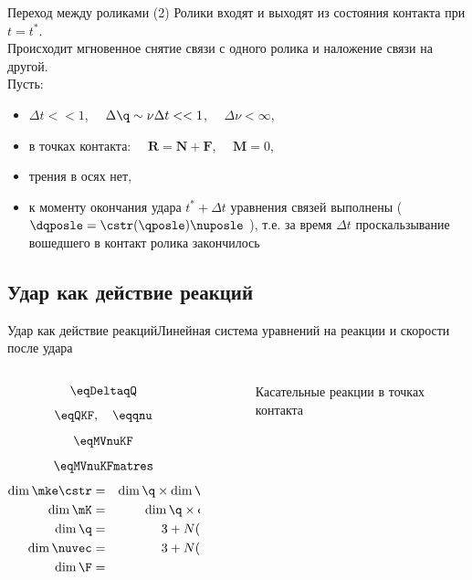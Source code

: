 \documentclass{beamer}
\begin{document}
\begin{frame}{Переход между роликами}
    \textcolor{Periwinkle}{(2) Ролики входят и выходят из состояния контакта при $t = t^*$.}\\
    Происходит мгновенное снятие связи с одного ролика и наложение связи на другой.\\
    Пусть:
    \begin{itemize}
        \item $\Delta t << 1$, $\quad \Delta \q \sim \nu\Delta t << 1$, $\quad \Delta \nu < \infty$,
        \item в точках контакта: $\quad \mathbf{R} = \mathbf{N} + \mathbf{F}$, $\quad \mathbf{M} = 0 $,
        \item трения в осях нет,
        \item к моменту окончания удара $t^*+\Delta t$ уравнения связей выполнены (\enspace $\dqposle = \cstr(\qposle)\nuposle \ $), т.е. за время $\Delta t$ проскальзывание вошедшего в контакт ролика закончилось
    \end{itemize}
\end{frame}

\subsection{Удар как действие реакций}

\begin{frame}{Удар как действие реакций}{Линейная система уравнений на реакции и скорости после удара}
    \begin{columns}
        \hspace{15pt}
        \begin{column}{0.35\textwidth}
            \vspace{-10pt}
            $$ \eqDeltaqQ $$
            $$ \eqQKF, \quad \eqqnu $$
            $$ \eqMVnuKF $$
            $$ \eqMVnuKFmatres $$
            \begin{eqnarray*}
                \dim \mke \cstr & = & \dim \q \times \dim \nuvec \\
                \dim \mK & = & \dim \q \times \dim \F \\
                \dim \q & = & 3 + N(n + 1) \\
                \dim \nuvec & = & 3 + N(n - 1) \\
                \dim \F & = & 2N
            \end{eqnarray*}
        \end{column}
        \hspace{55pt}
        \begin{column}{0.65\textwidth}
            \begin{figure}
                \hspace{-55pt}
                \caption{Касательные реакции в точках контакта}
            \end{figure}
        \end{column}
    \end{columns}
\end{frame}
\end{document}
